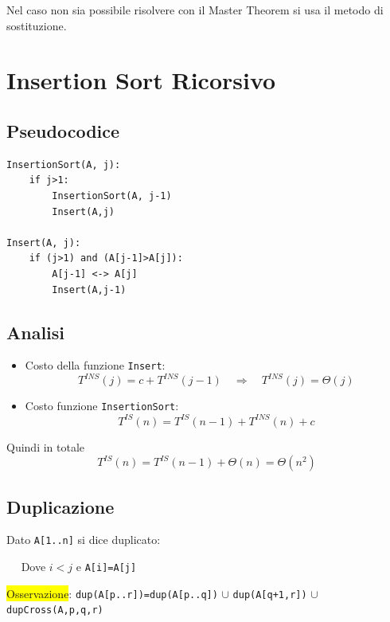 \documentclass{article}
\begin{document}
Nel caso non sia possibile risolvere con il Master Theorem si usa il metodo di sostituzione.

\section{Insertion Sort Ricorsivo}

\subsection{Pseudocodice}

\begin{verbatim}
InsertionSort(A, j):
    if j>1:
        InsertionSort(A, j-1)
        Insert(A,j)

Insert(A, j):
    if (j>1) and (A[j-1]>A[j]):
        A[j-1] <-> A[j]
        Insert(A,j-1)
\end{verbatim}

\subsection{Analisi}

\begin{itemize}
    \item Costo della funzione \texttt{Insert}:
    \[
    T^{INS}(j)=c+T^{INS}(j-1)\quad\Rightarrow\quad T^{INS}(j)=\Theta(j)
    \]
    \item Costo funzione \texttt{InsertionSort}:
    \[
    T^{IS}(n)=T^{IS}(n-1)+T^{INS}(n)+c
    \]
\end{itemize}
Quindi in totale
\[
\boxed{T^{IS}(n)=T^{IS}(n-1)+\Theta(n)=\Theta\left(n^2\right)}
\]

\subsection{Duplicazione}
Dato \texttt{A[1..n]} si dice duplicato:
\begin{center}
$\quad$ Dove $i<j$ e \texttt{A[i]=A[j]}
\end{center}
\colorbox{yellow}{Osservazione}: \texttt{dup(A[p..r])=dup(A[p..q])} $\cup$ \texttt{dup(A[q+1,r])} $\cup$ \texttt{dupCross(A,p,q,r)}
\end{document}
